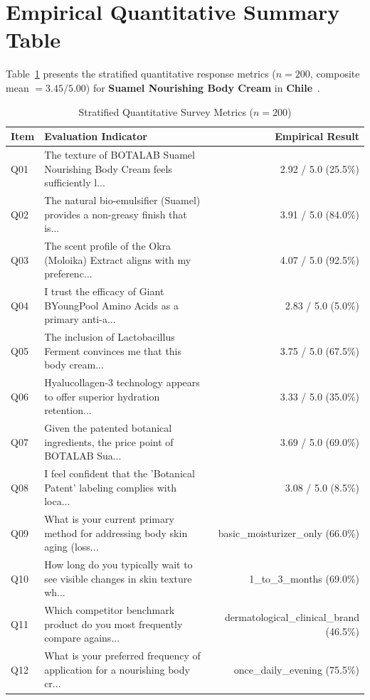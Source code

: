 \documentclass[10pt,twocolumn,a4paper]{article}
\begin{document}
\section{Empirical Quantitative Summary Table}
Table~\ref{tab:metrics} presents the stratified quantitative response metrics ($n = 200$, composite mean $= 3.45/5.00$) for \textbf{Suamel Nourishing Body Cream} in \textbf{Chile}~\cite{ref_kaggle_doi,ref_hf_doi}.

\begin{table}[t]
\centering
\caption{Stratified Quantitative Survey Metrics ($n = 200$)}
\label{tab:metrics}
\small
\begin{tabularx}{\textwidth}{l X r}
\toprule
\textbf{Item} & \textbf{Evaluation Indicator} & \textbf{Empirical Result} \\
\midrule
Q01 & The texture of BOTALAB Suamel Nourishing Body Cream feels sufficiently l... & 2.92 / 5.0 (25.5\%) \\
Q02 & The natural bio-emulsifier (Suamel) provides a non-greasy finish that is... & 3.91 / 5.0 (84.0\%) \\
Q03 & The scent profile of the Okra (Moloika) Extract aligns with my preferenc... & 4.07 / 5.0 (92.5\%) \\
Q04 & I trust the efficacy of Giant BYoungPool Amino Acids as a primary anti-a... & 2.83 / 5.0 (5.0\%) \\
Q05 & The inclusion of Lactobacillus Ferment convinces me that this body cream... & 3.75 / 5.0 (67.5\%) \\
Q06 & Hyalucollagen-3 technology appears to offer superior hydration retention... & 3.33 / 5.0 (35.0\%) \\
Q07 & Given the patented botanical ingredients, the price point of BOTALAB Sua... & 3.69 / 5.0 (69.0\%) \\
Q08 & I feel confident that the 'Botanical Patent' labeling complies with loca... & 3.08 / 5.0 (8.5\%) \\
Q09 & What is your current primary method for addressing body skin aging (loss... & basic\_moisturizer\_only (66.0\%) \\
Q10 & How long do you typically wait to see visible changes in skin texture wh... & 1\_to\_3\_months (69.0\%) \\
Q11 & Which competitor benchmark product do you most frequently compare agains... & dermatological\_clinical\_brand (46.5\%) \\
Q12 & What is your preferred frequency of application for a nourishing body cr... & once\_daily\_evening (75.5\%) \\

\end{tabularx}
\end{table}
\end{document}
